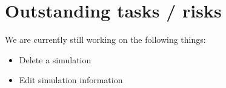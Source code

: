\documentclass[a4paper,12pt,final]{article}
\begin{document}
\section{Outstanding tasks / risks}
We are currently still working on the following things:
\begin{itemize}
\item Delete a simulation
\item Edit simulation information
\end{itemize}
\end{document}
